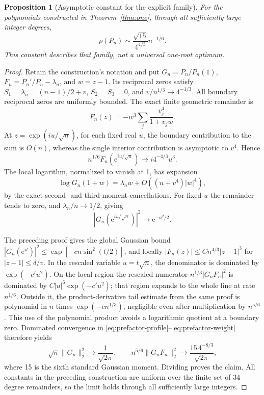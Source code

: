 \documentclass[11pt]{article}
\newtheorem{proposition}[theorem]{Proposition}
\theoremstyle{remark}\newtheorem{remark}[theorem]{Remark}
\newcommand{\norm}[1]{\lVert #1\rVert}
\newcommand{\ee}{\mathrm e}
\begin{document}
\begin{proposition}[Asymptotic constant for the explicit family]\label{prop:prefactor}
For the polynomials constructed in Theorem~\ref{thm:one},
through all sufficiently large integer degrees,
\[
 \rho(P_n)\sim\frac{\sqrt{15}}{4^{4/3}}n^{-1/6}.
\]
This constant describes that family, not a universal one-root optimum.
\end{proposition}
\begin{proof}
Retain the construction's notation and put
\(G_n=P_n/P_n(1)\), \(F_n=P_n'/P_n-\lambda_n\), and \(w=z-1\).
Its reciprocal zeros satisfy \(S_1=\lambda_n=(n-1)/2+v\),
\(S_2=S_3=0\), and \(v/n^{1/3}\to4^{-1/3}\).
All boundary reciprocal zeros are uniformly bounded.
The exact finite geometric remainder is
\[
 F_n(z)=-w^3\sum_j\frac{v_j^4}{1+v_jw}.
\]
At \(z=\exp(iu/\sqrt n)\), for each fixed real \(u\),
the boundary contribution to the sum is \(O(n)\), whereas the
single interior contribution is asymptotic to \(v^4\). Hence
\begin{equation}\label{eq:prefactor-profile}
 n^{1/6}F_n(\ee^{iu/\sqrt n})\longrightarrow
       i4^{-4/3}u^3.
\end{equation}
The local logarithm, normalized to vanish at 1, has expansion
\[
 \log G_n(1+w)=\lambda_n w+O((n+v^4)|w|^4),
\]
by the exact second- and third-moment cancellations. For fixed \(u\)
the remainder tends to zero, and \(\lambda_n/n\to1/2\), giving
\begin{equation}\label{eq:prefactor-weight}
 |G_n(\ee^{iu/\sqrt n})|^2\longrightarrow\ee^{-u^2/2}.
\end{equation}

The preceding proof gives the global Gaussian bound
\(|G_n(\ee^{it})|^2\le\exp[-cn\sin^2(t/2)]\), and locally
\(|F_n(z)|\le Cn^{4/3}|z-1|^3\) for \(|z-1|\le\delta/v\).
In the rescaled variable \(u=t\sqrt n\), the denominator is
dominated by \(\exp(-c'u^2)\). On the local region the rescaled
numerator \(n^{1/3}|G_nF_n|^2\) is dominated by
\(C|u|^6\exp(-c'u^2)\); that region expands to the whole line
at rate \(n^{1/6}\).
Outside it, the product-derivative tail estimate from the same proof
is polynomial in \(n\) times \(\exp(-c n^{1/3})\), negligible
even after multiplication by \(n^{5/6}\).
This use of the polynomial product avoids a logarithmic quotient
at a boundary zero.
Dominated convergence in \eqref{eq:prefactor-profile}--\eqref{eq:prefactor-weight}
therefore yields
\[
 \sqrt n\norm{G_n}_2^2\longrightarrow\frac1{\sqrt{2\pi}},
 \qquad
 n^{5/6}\norm{G_nF_n}_2^2\longrightarrow
       \frac{15\,4^{-8/3}}{\sqrt{2\pi}},
\]
where 15 is the sixth standard Gaussian moment.
Dividing proves the claim. All constants in the preceding construction
are uniform over the finite set of 34 degree remainders, so the limit
holds through all sufficiently large integers.
\end{proof}
\end{document}
